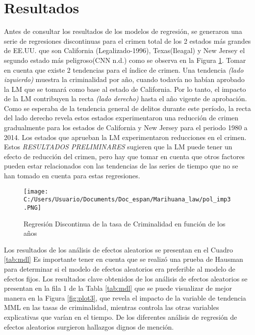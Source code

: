 \documentclass[11pt,]{article}
\begin{document}
\newpage

\hypertarget{resultados}{%
\section{Resultados}\label{resultados}}

Antes de consultar los resultados de los modelos de regresión, se
generaron una serie de regresiones discontinuas para el crimen total de
los 2 estados más grandes de EE.UU. que son California
(Legalizado-1996), Texas(Ileagal) y New Jersey el segundo estado más
peligroso(CNN n.d.) como se observa en la Figura \ref{plot2}. Tomar en
cuenta que existe 2 tendencias para el índice de crimen. Una tendencia
\emph{(lado izquierdo)} muestra la criminalidad por año, cuando todavía
no habían aprobado la LM que se tomará como base al estado de
California. Por lo tanto, el impacto de la LM contribuyen la recta
\emph{(lado derecho)} hasta el año vigente de aprobación. Como se
esperaba de la tendencia general de delitos durante este período, la
recta del lado derecho revela estos estados experimentaron una reducción
de crimen gradualmente para los estados de California y New Jersey para
el periodo 1980 a 2014. Los estados que aprueban la LM experimentaron
reducciones en el crimen. Estos \emph{RESULTADOS PRELIMINARES} sugieren
que la LM puede tener un efecto de reducción del crimen, pero hay que
tomar en cuenta que otros factores pueden estar relacionados con las
tendencias de las series de tiempo que no se han tomado en cuenta para
estas regresiones.

\begin{figure}
\centering
\texttt{[image: C:/Users/Usuario/Documents/Doc\_espan/Marihuana\_law/pol\_imp3.PNG]}
\caption{Regresión Discontinua de la tasa de Criminalidad en función de
los años \label{plot2}}
\end{figure}

Los resultados de los análisis de efectos aleatorios se presentan en el
Cuadro \ref{tab:mdl} Es importante tener en cuenta que se realizó una
prueba de Hausman para determinar si el modelo de efectos aleatorios era
preferible al modelo de efectos fijos. Los resultados clave obtenidos de
los análisis de efectos aleatorios se presentan en la fila 1 de la Tabla
\ref{tab:mdl} que se puede visualizar de mejor manera en la Figura
\ref{fig:plot3}, que revela el impacto de la variable de tendencia MML
en las tasas de criminalidad, mientras controla las otras variables
explicativas que varían en el tiempo. De los diferentes análisis de
regresión de efectos aleatorios surgieron hallazgos dignos de mención.
\end{document}
